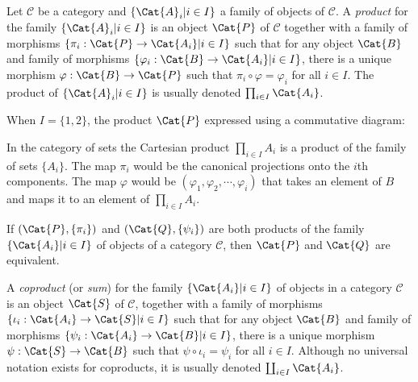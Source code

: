 \begin{Definition}
	Let $ \mathscr{C} $ be a category and $ \{\Cat{A}_i|i\in I \} $ a family of objects of $ \mathscr{C} $. A \textit{product} for the family $ \{\Cat{A}_i|i\in I \} $ is an object $ \Cat{P} $ of $ \mathscr{C} $ together with a family of morphisms $ \{\pi_i: \Cat{P} \to \Cat{A_i}|i \in I \} $ such that for any object $ \Cat{B} $ and family of morphisms $ \{\varphi_i: \Cat{B} \to \Cat{A_i}|i \in I \} $, there is a unique morphism $ \varphi :\Cat{B} \to \Cat{P} $ such that $ \pi_i \circ \varphi = \varphi_i $ for all $ i \in I $. The product of $ \{\Cat{A}_i|i\in I \} $ is usually denoted $ \prod_{i\in I}\Cat{A_i} $.
\end{Definition}
When $ I=\{1,2 \} $, the product $ \Cat{P}$ expressed using a commutative diagram:
\newpara
In the category of sets the Cartesian product $ \prod_{i\in I} A_i $ is a product of the family of sets $ \{A_i \} $. The map $ \pi_i $ would be the canonical projections onto the $ i $th components. The map $ \varphi $ would be $ (\varphi_1,\varphi_2,\cdots,\varphi_i) $ that takes an element of $ B $ and maps it to an element of $ \prod_{i\in I} A_i $.
\begin{Theorem}
	If $ (\Cat{P},\{\pi_i \}) $ and $ (\Cat{Q},\{\psi_i\}) $ are both products of the family $ \{\Cat{A_i}|i\in I  \} $ of objects of a category $ \mathscr{C} $, then $ \Cat{P} $ and $ \Cat{Q} $ are equivalent.
\end{Theorem}
\begin{Definition}
	A \textit{coproduct} (or \textit{sum}) for the family $ \{\Cat{A_i}|i \in I \} $ of objects in a category $ \mathscr{C} $ is an object $ \Cat{S} $ of $ \mathscr{C} $, together with a family of morphisms $ \{\iota_i:\Cat{A_i}\to \Cat{S}|i \in I \} $ such that for any object $ \Cat{B} $ and family of morphisms $ \{\psi_i:\Cat{A_i}\to \Cat{B} |i \in I \} $, there is a unique morphism $ \psi:\Cat{S} \to \Cat{B} $ such that $ \psi \circ \iota_i = \psi_i $ for all $ i \in I $. Although no universal notation exists for coproducts, it is usually denoted $ \coprod_{i \in I }\Cat{A_i} $.
\end{Definition}
